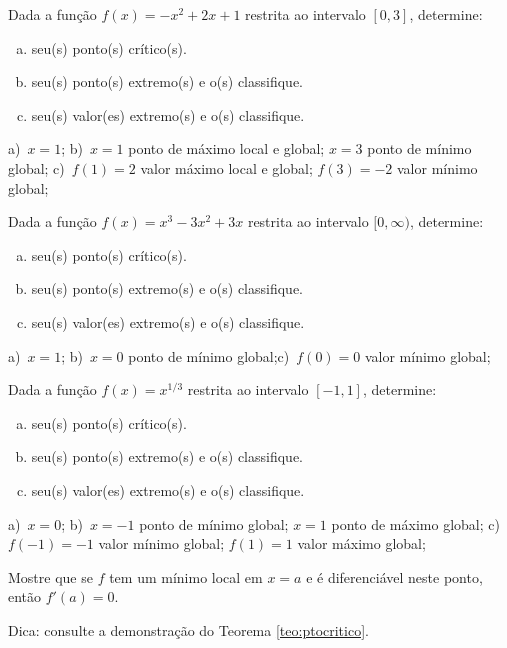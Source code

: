 \begin{exer}
  Dada a função $f(x)=-x^2+2x+1$ restrita ao intervalo $[0,3]$, determine:
  \begin{enumerate}[a)]
  \item seu(s) ponto(s) crítico(s).
  \item seu(s) ponto(s) extremo(s) e o(s) classifique.
  \item seu(s) valor(es) extremo(s) e o(s) classifique.
  \end{enumerate}
\end{exer}
\begin{resp}
  a)~$x=1$; b)~$x=1$ ponto de máximo local e global; $x=3$ ponto de mínimo global; c)~$f(1)=2$ valor máximo local e global; $f(3)=-2$ valor mínimo global;
\end{resp}

\begin{exer}
  Dada a função $f(x)=x^{3} - 3 x^{2} + 3 x$ restrita ao intervalo $[0, \infty)$, determine:
  \begin{enumerate}[a)]
  \item seu(s) ponto(s) crítico(s).
  \item seu(s) ponto(s) extremo(s) e o(s) classifique.
  \item seu(s) valor(es) extremo(s) e o(s) classifique.
  \end{enumerate}
\end{exer}
\begin{resp}
  a)~$x=1$; b)~$x=0$ ponto de mínimo global;c)~$f(0)=0$ valor mínimo global;
\end{resp}

\begin{exer}
  Dada a função $f(x)=x^{1/3}$ restrita ao intervalo $[-1,1]$, determine:
  \begin{enumerate}[a)]
  \item seu(s) ponto(s) crítico(s).
  \item seu(s) ponto(s) extremo(s) e o(s) classifique.
  \item seu(s) valor(es) extremo(s) e o(s) classifique.
  \end{enumerate}
\end{exer}
\begin{resp}
  a)~$x=0$; b)~$x=-1$ ponto de mínimo global; $x=1$ ponto de máximo global; c)~$f(-1)=-1$ valor mínimo global; $f(1)=1$ valor máximo global;
\end{resp}

\begin{exer}\label{exer:ptocritico}
  Mostre que se $f$ tem um mínimo local em $x=a$ e é diferenciável neste ponto, então $f'(a)=0$.
\end{exer}
\begin{resp}
  Dica: consulte a demonstração do Teorema \ref{teo:ptocritico}.
\end{resp}

